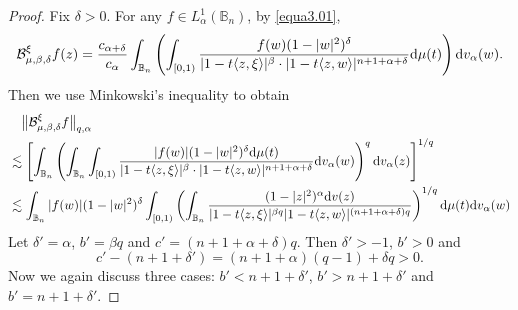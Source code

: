 \documentclass[preprint,12pt,times]{elsarticle}
\theoremstyle{definition}
\theoremstyle{remark}
\numberwithin{equation}{section}
\begin{document}
\begin{proof}
Fix $\delta>0$. For any $f\in L_{\alpha}^1(\mathbb{B}_n)$, by \eqref{equa3.01}, 
\begin{align*}
\mathcal{B}_{\mu,\beta,\delta}^{\xi}f(z)=\frac{c_{\alpha+\delta}}{c_{\alpha}}\int_{\mathbb{B}_n}\left(\int_{[0,1)}\frac{f(w)(1-|w|^2)^{\delta}}{|1-t\langle z,\xi\rangle|^{\beta}\cdot|1-t\langle z,w\rangle|^{n+1+\alpha+\delta}}{\rm d}\mu(t)\right){\rm d}v_{\alpha}(w).
\end{align*}
Then we use Minkowski's inequality to obtain
\begin{equation}\label{equa3.10}
\begin{split}
&\quad\big\|\mathcal{B}_{\mu,\beta,\delta}^{\xi}f\big\|_{q,\alpha}\\
&\lesssim \left[\int_{\mathbb{B}_n}\left(\int_{\mathbb{B}_n}\int_{[0,1)}\frac{|f(w)|(1-|w|^2)^{\delta}{\rm d}\mu(t)}{|1-t\langle z,\xi\rangle|^{\beta}\cdot|1-t\langle z,w\rangle|^{n+1+\alpha+\delta}}{\rm d}v_{\alpha}(w)\right)^q{\rm d}v_{\alpha}(z)\right]^{1/q}\\
&\lesssim \int_{\mathbb{B}_n}|f(w)|(1-|w|^2)^{\delta}\int_{[0,1)}\left(\int_{\mathbb{B}_n}\frac{(1-|z|^2)^{\alpha}{\rm d}v(z)}{|1-t\langle z,\xi\rangle|^{\beta q}|1-t\langle z,w\rangle|^{(n+1+\alpha+\delta)q}}\right)^{1/q}{\rm d}\mu(t){\rm d}v_{\alpha}(w)
\end{split}
\end{equation}
Let $\delta'=\alpha$, $b'=\beta q$ and $c'=(n+1+\alpha+\delta)q$. Then $\delta'>-1$, $b'>0$ and 
\[
    c'-(n+1+\delta')=(n+1+\alpha)(q-1)+\delta q>0.
\]
Now we again discuss three cases: $b'<n+1+\delta'$, $b'>n+1+\delta'$ and $b'=n+1+\delta'$.


\end{proof}
\end{document}
